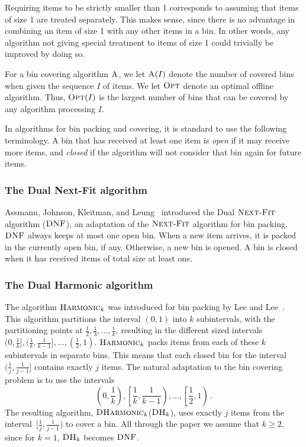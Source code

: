 \documentclass[11pt]{article}
\newcommand{\ALG}{\ensuremath{\operatorname{\textsc{A}}}\xspace}
\newcommand{\OPT}{\ensuremath{\operatorname{\textsc{Opt}}}\xspace}
\newcommand{\DNF}{\ensuremath{\operatorname{\textsc{DNF}}}\xspace}
\newcommand{\nextfit}{\ensuremath{\operatorname{\textsc{Next-Fit}}}\xspace}
\newcommand{\harm}{{\ensuremath{\textsc{Harmonic}_k}}\xspace}
\newcommand{\Har}{{\ensuremath{\textsc{DHarmonic}_k}}\xspace}
\newcommand{\DHk}{{\ensuremath{\textsc{DH}_k}}\xspace}
\begin{document}
Requiring items to be strictly smaller than 1 corresponds to assuming
 that items of size 1 are treated separately.
This makes sense, since there is no advantage in combining an item of
 size 1 with any other items in a bin.
In other words, any algorithm not giving special treatment to items
of size 1 could trivially be improved by doing so.

For a bin covering algorithm \ALG, we let $\ALG(I)$ denote the number
 of covered bins when given the sequence $I$ of items. 
We let $\OPT$ denote an optimal offline algorithm.
Thus, $\OPT(I)$ is the largest number of bins that can be covered
by any algorithm processing $I$.

In algorithms for bin packing and covering, it is standard to use the
following terminology.
A bin that has received at least one item is \emph{open} if it may
receive more items, and \emph{closed}
if the algorithm will not consider
that bin again for future items.

\subsubsection*{The Dual Next-Fit algorithm}
Assmann, Johnson, Kleitman, and Leung~\cite{AJKL84j} introduced the
Dual \nextfit algorithm 
(\DNF), an adaptation of the \nextfit algorithm for bin packing.
\DNF always keeps at most one open bin. 
When a new item arrives, it is packed in the currently open bin, if
 any.
Otherwise, a new bin is opened.
A bin is closed when it has received items of total size at least one.

\subsubsection*{The Dual Harmonic algorithm}
The algorithm \harm was introduced for bin packing by Lee and Lee~\cite{HL85}. This algorithm
partitions the interval $(0,1)$ into $k$ subintervals,
with the partitioning points at $\frac{1}{2},\frac{1}{3},\dots, \frac{1}{k}$,
resulting in the different sized intervals
$(0,\frac{1}{k}],(\frac{1}{k},\frac{1}{k-1}],\dots,(\frac{1}{2},1)$.
\harm packs items from each of
these $k$ subintervals in separate bins.
This means that each closed bin for the interval~$(\frac{1}{j},\frac{1}{j-1}]$ 
contains exactly $j$ items.
The natural adaptation to the bin covering problem is to use the intervals
$$\left(0,\frac{1}{k}\right),\left[\frac{1}{k},\frac{1}{k-1}\right),\dots,\left[\frac{1}{2},1\right)\,.$$
The resulting algorithm, \Har (\DHk), uses exactly $j$ items from the
interval~$[\frac{1}{j},\frac{1}{j-1})$ to cover a bin.
All through the paper we assume that $k\geq 2$, since for $k=1$,
\DHk becomes \DNF.
\end{document}

